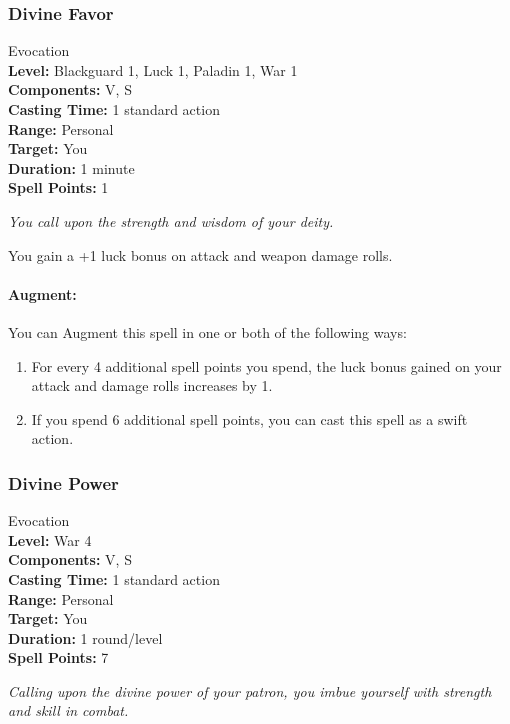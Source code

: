 \subsubsection{Divine Favor}
\label{Spell:DivineFavor}
Evocation
\\ \textbf{Level:} Blackguard 1, Luck 1, Paladin 1, War 1
\\ \textbf{Components:} V, S
\\ \textbf{Casting Time:} 1 standard action
\\ \textbf{Range:} Personal
\\ \textbf{Target:} You
\\ \textbf{Duration:} 1 minute
\\ \textbf{Spell Points:} 1

\emph{You call upon the strength and wisdom of your deity.}

You gain a +1 luck bonus on attack and weapon damage rolls.%

\paragraph{Augment:} You can Augment this spell in one or both of the following ways:
\begin{enumerate}
 \item For every 4 additional spell points you spend, the luck bonus gained on your attack and damage rolls increases by 1.
 \item If you spend 6 additional spell points, you can cast this spell as a swift action.
\end{enumerate}


\subsubsection{Divine Power}
\label{Spell:DivinePower}
Evocation
\\ \textbf{Level:} War 4
\\ \textbf{Components:} V, S
\\ \textbf{Casting Time:} 1 standard action
\\ \textbf{Range:} Personal
\\ \textbf{Target:} You
\\ \textbf{Duration:} 1 round/level
\\ \textbf{Spell Points:} 7

\emph{Calling upon the divine power of your patron, you imbue yourself with strength and skill in combat.}

